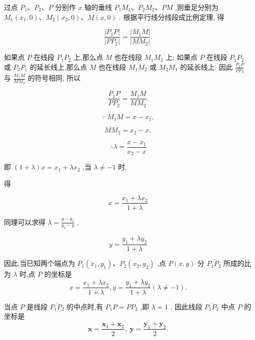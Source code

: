 \documentclass[lang=cn,newtx,12pt,scheme=chinese]{elegantbook}
\begin{document}
过点 \({P}_{1}\text{、}{P}_{2}\text{、}P\) 分别作 \(x\) 轴的垂线 \({P}_{1}{M}_{1}\text{、}{P}_{2}{M}_{2}\text{、}{PM}\) ,则垂足分别为 \({M}_{1}\left( {{x}_{1},0}\right) \text{、}{M}_{2}\left( {{x}_{2},0}\right) \text{、}M\left( {x,0}\right)\) . 根据平行线分线段成比例定理, 得

\[
  \frac{\left| {P}_{1}P\right| }{\left| P{P}_{2}\right| } = \frac{\left| {M}_{1}M\right| }{\left| M{M}_{2}\right| }.
\]

如果点 \(P\) 在线段 \({P}_{1}{P}_{2}\) 上,那么点 \(M\) 也在线段 \({M}_{1}{M}_{2}\) 上; 如果点 \(P\) 在线段 \({P}_{1}{P}_{2}\) 或 \({P}_{2}{P}_{1}\) 的延长线上,那么点 \(M\) 也在线段 \({M}_{1}{M}_{2}\) 或 \({M}_{2}{M}_{1}\) 的延长线上. 因此 \(\frac{{P}_{1}P}{P{P}_{2}}\) 与 \(\frac{{M}_{1}M}{M{M}_{2}}\) 的符号相同, 所以

\[
  \frac{{P}_{1}P}{P{P}_{2}} = \frac{{M}_{1}M}{M{M}_{2}}.
\]

\[
  \because \;{M}_{1}M = x - {x}_{1},
\]

\[
  M{M}_{2} = {x}_{2} - x,
\]

\[
  \therefore \lambda = \frac{x - {x}_{1}}{{x}_{2} - x}
\]

即 \(\left( {1 + \lambda }\right) x = {x}_{1} + \lambda {x}_{2}\) ,当 \(\lambda \neq - 1\) 时,

得

\[
  x = \frac{{x}_{1} + \lambda {x}_{2}}{1 + \lambda }
\]

同理可以求得 \(\lambda = \frac{y - {y}_{1}}{{y}_{2} - y}\) ,

\[
  y = \frac{{y}_{1} + \lambda {y}_{2}}{1 + \lambda }
\]

\begin{corollary}[定比分点的坐标]

因此,当已知两个端点为 \({P}_{1}\left( {{x}_{1},{y}_{1}}\right) \text{、}{P}_{2}\left( {{x}_{2},{y}_{2}}\right)\) ,点 \(P\left( {x,y}\right)\) 分 \(\overline{{P}_{1}{P}_{2}}\) 所成的比为 \(\lambda\) 时,点 \(P\) 的坐标是
\[
  x = \frac{{x}_{1} + \lambda {x}_{2}}{1 + \lambda },y = \frac{{y}_{1} + \lambda {y}_{2}}{1 + \lambda }\left( {\lambda \neq - 1}\right) .
\]
\end{corollary}

\begin{corollary}[中点的坐标]

当点 \(P\) 是线段 \(\overline{{P}_{1}{P}_{2}}\) 的中点时,有 \({P}_{1}P = P{P}_{2}\) ,即 \(\lambda = 1\) . 因此线段 \(\overline{{P}_{1}{P}_{2}}\) 中点 \(P\) 的坐标是
\[
\mathbf{x} = \frac{{\mathbf{x}}_{1} + {\mathbf{x}}_{2}}{2},\;\mathbf{y} = \frac{{\mathbf{y}}_{1} + {\mathbf{y}}_{2}}{2}.
\]
\end{corollary}
\end{document}
